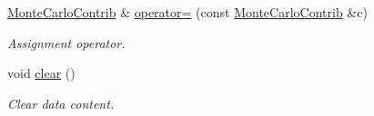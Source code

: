 \begin{DoxyCompactItemize}
\hyperlink{class_d_d4hep_1_1_simulation_1_1_geant4_hit_data_1_1_monte_carlo_contrib}{Monte\+Carlo\+Contrib} \& \hyperlink{class_d_d4hep_1_1_simulation_1_1_geant4_hit_data_1_1_monte_carlo_contrib_a99c408c786e0d76e316f223e08b194ed}{operator=} (const \hyperlink{class_d_d4hep_1_1_simulation_1_1_geant4_hit_data_1_1_monte_carlo_contrib}{Monte\+Carlo\+Contrib} \&c)
\begin{DoxyCompactList}\small\item\em Assignment operator. \end{DoxyCompactList}\item 
void \hyperlink{class_d_d4hep_1_1_simulation_1_1_geant4_hit_data_1_1_monte_carlo_contrib_af7e749692449e5c3294c3c60b5d056fe}{clear} ()
\begin{DoxyCompactList}\small\item\em Clear data content. \end{DoxyCompactList}\end{DoxyCompactItemize}
